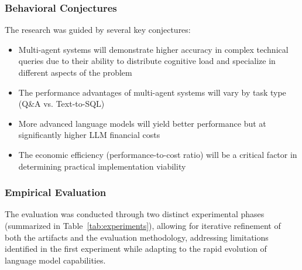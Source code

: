         
        \subsubsection{Behavioral Conjectures}
        
        The research was guided by several key conjectures:
        
        \begin{tcolorbox}[colback=gray!10, colframe=gray!40, title=Key Research Conjectures]
            \begin{itemize}
            \item Multi-agent systems will demonstrate higher accuracy in complex technical queries due to their ability to distribute cognitive load and specialize in different aspects of the problem
            \item The performance advantages of multi-agent systems will vary by task type (Q\&A vs. Text-to-SQL)
            \item More advanced language models will yield better performance but at significantly higher LLM financial costs
            \item The economic efficiency (performance-to-cost ratio) will be a critical factor in determining practical implementation viability
            \end{itemize}
        \end{tcolorbox}
        
        \subsubsection{Empirical Evaluation}
        
        The evaluation was conducted through two distinct experimental phases (summarized in Table~\ref{tab:experiments}), allowing for iterative refinement of both the artifacts and the evaluation methodology, addressing limitations identified in the first experiment while adapting to the rapid evolution of language model capabilities.
        
